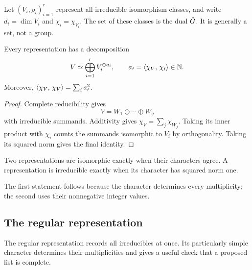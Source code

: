 Let $(V_i,\rho_i)_{i=1}^r$ represent all irreducible isomorphism classes,
and write $d_i=\dim V_i$ and $\chi_i=\chi_{V_i}$. The set of these classes
is the dual $\hat{G}$. It is generally a set, not a group.


\begin{prop}
\label{unicite-decomposition-prop}\label{notation-90}
Every representation has a decomposition
\begin{equation}
\label{eq-decomposition-representation}
 V\simeq\bigoplus_{i=1}^r V_i^{\oplus a_i},\qquad
 a_i=\langle \chi_V,\,\chi_i\rangle\in\mathbb{N}.
\end{equation}
Moreover, $\langle \chi_V,\,\chi_V\rangle=\sum_i a_i^2$.
\end{prop}
\begin{proof}
Complete reducibility gives
\begin{equation}
\label{eq-unicite-decomposition}
 V=W_1\oplus\cdots\oplus W_q
\end{equation}
with irreducible summands. Additivity gives $\chi_V=\sum_j\chi_{W_j}$.
Taking its inner product with $\chi_i$ counts the summands isomorphic
to $V_i$ by orthogonality. Taking its squared norm gives the final identity.
\end{proof}


\begin{cor}
\label{cor-representation-isomorphes-caracteres}
Two representations are isomorphic exactly when their characters agree.
A representation is irreducible exactly when its character has squared
norm one.
\end{cor}
The first statement follows because the character determines every
multiplicity; the second uses their nonnegative integer values.

\subsection{The regular representation}
\label{sect2-enumeration-results}

The regular representation records all irreducibles at once. Its
particularly simple character determines their multiplicities and gives a
useful check that a proposed list is complete.

